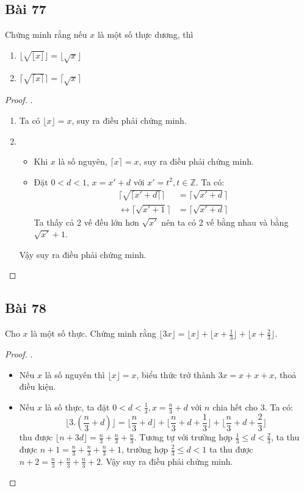 \subsection*{Bài 77}
Chứng minh rằng nếu $x$ là một số thực dương, thì
\begin{enumerate}[label=\alph*)]
    \item $\lfloor\sqrt{\lfloor x\rfloor}\rfloor=\lfloor\sqrt x\rfloor$
    \item $\lceil\sqrt{\lceil x\rceil}\rceil=\lceil\sqrt x\rceil$
\end{enumerate}
\begin{proof}.
    \begin{enumerate}[label=\alph*)]
        \item Ta có $\lfloor x\rfloor=x$, suy ra điều phải chứng minh.
        \item \begin{itemize}
            \item Khi $x$ là số nguyên, $\lceil x\rceil=x$, suy ra điều phải chứng minh.
            \item Đặt $0<d<1$, $x=x'+d$ với $x'=t^2,t\in\mathbb{Z}$. Ta có:
            \begin{align*}
                \lceil\sqrt{\lceil x'+d\rceil}\rceil&=\lceil\sqrt{x'+d}\rceil\\
                \leftrightarrow\lceil\sqrt{x'+1}\rceil&=\lceil\sqrt{x'+d}\rceil
            \end{align*}
            Ta thấy cả 2 vế đều lớn hơn $\sqrt{x'}$ nên ta có 2 vế bằng nhau và bằng $\sqrt{x'}+1$.
        \end{itemize}
        Vậy suy ra điều phải chứng minh.
    \end{enumerate}
\end{proof}
\subsection*{Bài 78}
Cho $x$ là một số thực. Chứng minh rằng $\lfloor3x\rfloor=\lfloor x\rfloor+\lfloor x+\frac{1}{3}\rfloor+\lfloor x+\frac{2}{3}\rfloor$.
\begin{proof}.
    \begin{itemize}
        \item Nếu $x$ là số nguyên thì $\lfloor x\rfloor=x$, biểu thức trở thành $3x=x+x+x$, thoả điều kiện.
        \item Nếu $x$ là số thực, ta đặt $0<d<\frac{1}{3},x=\frac{n}{3}+d$ với $n$ chia hết cho 3. Ta có: $$\bigg\lfloor3.(\frac{n}{3}+d)\bigg\rfloor=\bigg\lfloor\frac{n}{3}+d\bigg\rfloor+\bigg\lfloor\frac{n}{3}+d+\frac{1}{3}\bigg\rfloor+\bigg\lfloor\frac{n}{3}+d+\frac{2}{3}\bigg\rfloor$$
        thu được $\lfloor n+3d\rfloor=\frac{n}{3}+\frac{n}{3}+\frac{n}{3}$. Tương tự với trường hợp $\frac{1}{3}\leq d<\frac{2}{3}$, ta thu được $n+1=\frac{n}{3}+\frac{n}{3}+\frac{n}{3}+1$, trường hợp $\frac{2}{3}\leq d<1$ ta thu được $n+2=\frac{n}{3}+\frac{n}{3}+\frac{n}{3}+2$. Vậy suy ra điều phải chứng minh.
    \end{itemize}
\end{proof}
